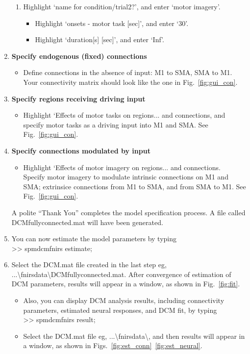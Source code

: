\begin{enumerate}
\begin{enumerate}
\item Highlight `name for condition/trial2?', and enter `motor imagery'. 
\begin{itemize}
\item Highlight `onsets - motor task [sec]', and enter `30'. 
\item Highlight `duration[s] [sec]', and enter `Inf'. 
\end{itemize}
\end{enumerate}
\item \textbf{Specify endogenous (fixed) connections}
\begin{itemize}
\item Define connections in the absence of input: M1 to SMA, SMA to M1. \\Your connectivity matrix should look like the one in Fig.~\ref{fig:gui_con}.
\end{itemize}
\item \textbf{Specify regions receiving driving input}
\begin{itemize}
\item Highlight `Effects of motor tasks on regions... and connections, and specify motor tasks as a driving input into M1 and SMA. See Fig.~\ref{fig:gui_con}.
\end{itemize}
\item \textbf{Specify connections modulated by input}
\begin{itemize}
\item Highlight `Effects of motor imagery on regions... and connections. \\Specify motor imagery to modulate intrinsic connections on M1 and SMA; extrinsice connections from M1 to SMA, and from SMA to M1. See Fig.~\ref{fig:gui_con}. 
\end{itemize}
A polite ``Thank You'' completes the model specification process. A file called DCM\textunderscore fully\textunderscore connected.mat will have been generated. 
\item You can now estimate the model parameters by typing \\
>> spm\textunderscore dcm\textunderscore fnirs \textunderscore estimate;
\item Select the DCM.mat file created in the last step eg, ...\textbackslash fnirs\textunderscore data\textbackslash DCM\textunderscore fully\textunderscore connected.mat. After convergence of estimation of DCM parameters, results will appear in a window, as shown in Fig.~\ref{fig:fit}. 

\begin{itemize}
\item Also, you can display DCM analysis results, including connectivity parameters, estimated neural responses, and DCM fit, by typing \\ 
>> spm\textunderscore dcm\textunderscore fnirs \textunderscore result;
\item Select the DCM.mat file eg, ...\textbackslash fnirs\textunderscore data\textbackslash, and then results will appear in a window, as shown in Figs.~\ref{fig:est_conn}~\ref{fig:est_neural}. 
\end{itemize}
\end{enumerate}

